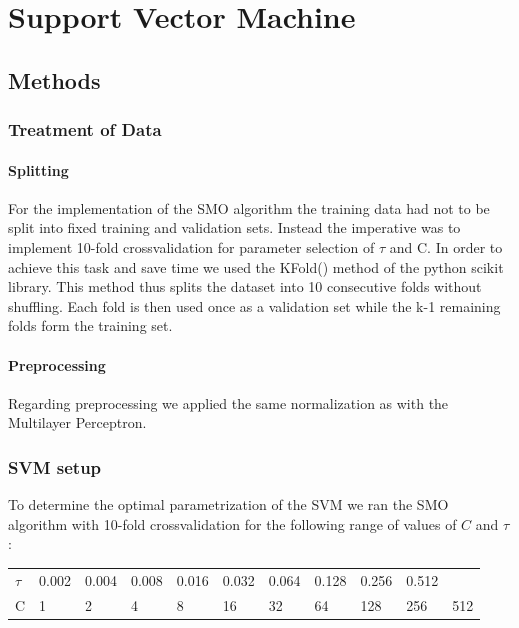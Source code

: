 \section{Support Vector Machine}

\subsection{Methods}
\subsubsection{Treatment of Data}
\paragraph{Splitting}
For the implementation of the SMO algorithm the training data had not to be split into fixed training and validation sets. Instead the imperative was to implement 10-fold crossvalidation for parameter selection of $\tau$ and C. In order to achieve this task and save time we used the KFold() method of the python scikit library. This method thus splits the dataset into 10 consecutive folds without shuffling. Each fold is then used once as a validation set while the k-1 remaining folds form the training set.
\paragraph{Preprocessing}
Regarding preprocessing we applied the same normalization as with the Multilayer Perceptron.

\subsubsection{SVM setup}
To determine the optimal parametrization of the SVM we ran the SMO algorithm with 10-fold crossvalidation for the following range of values of $C$ and $\tau$:
\begin{center}
\begin{tabular}{l|llllllllll} 
	\toprule
	$\tau$ & 0.002 & 0.004 & 0.008 & 0.016 & 0.032 & 0.064 & 0.128 & 0.256 & 0.512 \\
	C & 1 & 2 & 4 & 8 & 16 & 32 & 64 & 128 & 256 & 512 \\
	\bottomrule
\end{tabular}
\end{center}

